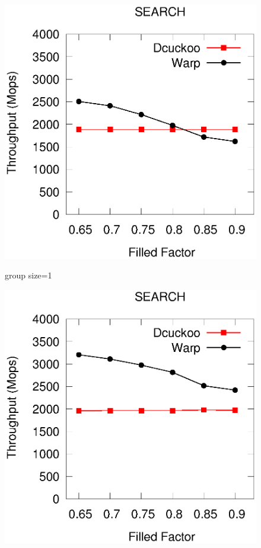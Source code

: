\begin{figure}[htp]
	\begin{minipage}{0.16\linewidth}\centering
		\includegraphics[width=\linewidth]{pic/group-size/g1-search.eps}
		\centerline{group size=1}
	\end{minipage}
	\begin{minipage}{0.16\linewidth}\centering
		\includegraphics[width=\linewidth]{pic/group-size/g2-search.eps}

\end{minipage}
\end{figure}
